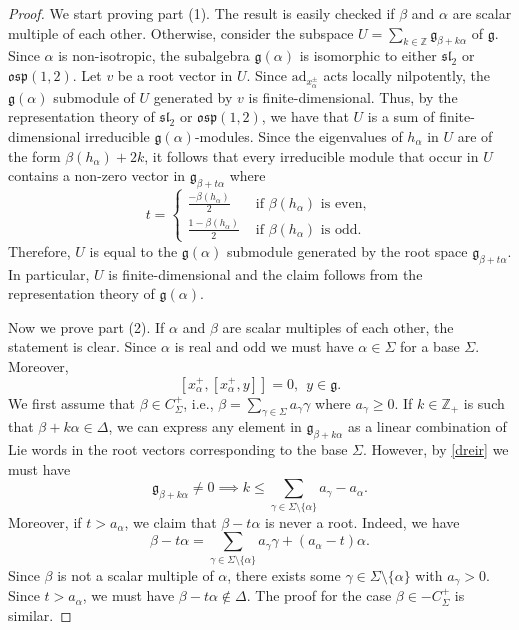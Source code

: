 \documentclass[11pt,reqno]{amsart}
\theoremstyle{plain}
\theoremstyle{definition}
\theoremstyle{remark}
\newcommand{\lie}[1]{\mathfrak{#1}}
\numberwithin{equation}{section}
\begin{document}
\begin{proof}
 We start proving part (1). The result is easily checked if $\beta$ and $\alpha$ are scalar multiple of each other. Otherwise, consider the subspace $U=\sum_{k\in \mathbb{Z}} \lie g_{\beta+k\alpha}$ of $\lie g.$ Since $\alpha$ is non-isotropic, the subalgebra $\lie g(\alpha)$ 
    is isomorphic to either $\lie{sl}_2$ or $\lie{osp}(1,2).$ Let $v$ be a root vector in $U.$ Since $\mathrm{ad}_{x_\alpha^\pm}$ acts locally nilpotently, the $\lie g{(\alpha)}$ submodule of $U$ generated by $v$ is finite-dimensional. Thus, by the representation theory of $\lie{sl}_2$ or $\lie{osp}(1,2)$, we have that $U$ is a sum of finite-dimensional irreducible $\lie g{(\alpha)}$-modules. 
    Since the eigenvalues of $h_\alpha$ in $U$ are of the form $\beta(h_\alpha)+2k$, it follows that every irreducible module that occur in $U$ contains a non-zero vector in $\lie g_{\beta+t\alpha}$ where $$t=\begin{cases}
        \frac{-\beta(h_\alpha)}{2}& \text{ if } \beta(h_\alpha) \text{ is even},\\
        \frac{1-\beta(h_\alpha)}{2}& \text{ if } \beta(h_\alpha) \text{ is odd}.
    \end{cases}$$
    Therefore, $U$ is equal to the $\lie g{(\alpha)}$ submodule generated by the root space $\lie g_{\beta+t\alpha}$. In particular, $U$ is finite-dimensional and the claim follows from the representation theory of $\lie g(\alpha).$
    
  Now we prove part (2). If $\alpha$ and $\beta$ are scalar multiples of each other, the statement is clear. Since $\alpha$ is real and odd we must have $\alpha\in\Sigma$ for a base $\Sigma$. Moreover, 
\begin{equation}\label{dreir}[x^+_{\alpha},[x_{\alpha}^+,y]]=0,\ \ y\in \lie g.\end{equation} We first assume that $\beta\in C^+_\Sigma$, i.e., $\beta=\sum_{\gamma\in \Sigma}a_{\gamma}\gamma$ where $a_{\gamma}\geq 0$. If $k\in \mathbb{Z}_+$ is such that $\beta+k\alpha\in \Delta$, we can express any element in $\mathfrak{g}_{\beta+k\alpha}$ as a linear combination of Lie words in the root vectors corresponding to the base $\Sigma$. However, by \eqref{dreir} we must have 
$$\mathfrak{g}_{\beta+k\alpha}\neq 0 \implies k\leq \sum_{\gamma\in \Sigma\setminus\{\alpha\}}a_\gamma-a_\alpha.$$
Moreover, if $t > a_\alpha$, we claim that $\beta - t\alpha$ is never a root. Indeed, we have
$$\beta - t\alpha = \sum_{\gamma \in \Sigma \setminus \{\alpha\}} a_{\gamma} \gamma + (a_\alpha - t)\alpha.$$
Since $\beta$ is not a scalar multiple of $\alpha$, there exists some $\gamma \in \Sigma \setminus \{\alpha\}$ with $a_{\gamma} > 0$. Since $t > a_\alpha$, we must have $\beta - t\alpha\notin \Delta$. The proof  for the case $\beta\in -C^+_\Sigma$ is similar.
\end{proof}
\end{document}
